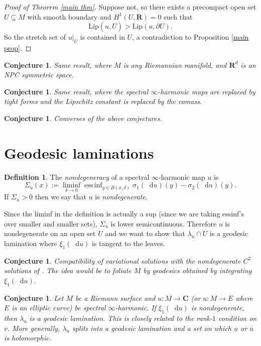 \documentclass[reqno,11pt]{amsart}
\newcommand{\RR}{\mathbf{R}}
\newcommand{\CC}{\mathbf{C}}
\newcommand*\dif{\mathop{}\!\mathrm{d}}
\newcommand{\Lip}{\mathrm{Lip}}
\DeclareMathOperator*{\essinf}{ess\,inf}
\newcommand{\dfn}[1]{\emph{#1}\index{#1}}
\newtheorem{conjecture}[theorem]{Conjecture}
\theoremstyle{definition}
\newtheorem{definition}[theorem]{Definition}
\numberwithin{equation}{section}
\begin{document}
\begin{proof}[Proof of Theorem \ref{main thm}]
Suppose not, so there exists a precompact open set $U \subseteq M$ with smooth boundary and $H^1(U, \RR) = 0$ such that 
$$\Lip(u, \overline U) > \Lip(u, \partial U).$$
So the stretch set of $u|_{\overline U}$ is contained in $U$, a contradiction to Proposition \ref{main prop}.
\end{proof}

\begin{conjecture}
Same result, where $M$ is any Riemannian manifold, and $\RR^d$ is an NPC symmetric space.
\end{conjecture}

\begin{conjecture}
Same result, where the spectral $\infty$-harmonic maps are replaced by tight forms and the Lipschitz constant is replaced by the comass.
\end{conjecture}

\begin{conjecture}
Converses of the above conjectures.
\end{conjecture}

\section{Geodesic laminations}
\begin{definition}
The \dfn{nondegeneracy} of a spectral $\infty$-harmonic map $u$ is 
$$\Sigma_u(x) := \liminf_{\delta \to 0} \essinf_{y \in B(x, \delta)} \sigma_1(\dif u)(y) - \sigma_2(\dif u)(y).$$
If $\Sigma_u > 0$ then we say that $u$ is \dfn{nondegenerate}.
\end{definition}

Since the liminf in the definition is actually a sup (since we are taking essinf's over smaller and smaller sets), $\Sigma_u$ is lower semicontinuous.
Therefore $u$ is nondegenerate on an open set $U$ and we want to show that $\lambda_u \cap U$ is a geodesic lamination where $\xi_1(\dif u)$ is tangent to the leaves.
  
\begin{conjecture}
Compatibility of variational solutions with the nondegenerate $C^2$ solutions of \cite{Sheffield2010VectorvaluedOL}.
The idea would be to foliate $M$ by geodesics obtained by integrating $\xi_1(\dif u)$.
\end{conjecture}

\begin{conjecture}
Let $M$ be a Riemann surface and $u: M \to \CC$ (or $u: M \to E$ where $E$ is an elliptic curve) be spectral $\infty$-harmonic.
If $\xi_1(\dif u)$ is nondegenerate, then $\lambda_u$ is a geodesic lamination.
This is closely related to the rank-$1$ condition on $v$.
More generally, $\lambda_u$ splits into a geodesic lamination and a set on which $u$ or $\overline u$ is holomorphic.
\end{conjecture}


\printbibliography
\end{document}
